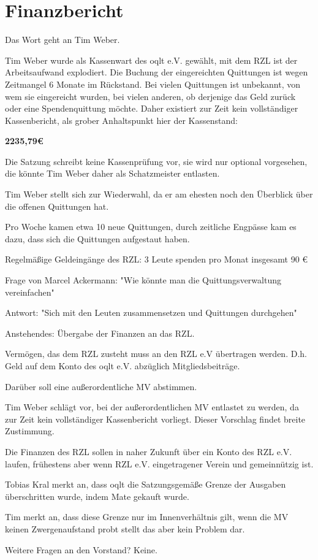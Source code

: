 \documentclass{scrartcl}
\begin{document}
\section{Finanzbericht}
{
Das Wort geht an Tim Weber.

Tim Weber wurde als Kassenwart des oqlt e.V. gewählt, mit dem RZL ist der Arbeitsaufwand explodiert.
Die Buchung der eingereichten Quittungen ist wegen Zeitmangel 6 Monate im Rückstand.
Bei vielen Quittungen ist unbekannt, von wem sie eingereicht wurden,
bei vielen anderen, ob derjenige das Geld zurück oder eine Spendenquittung möchte.
Daher existiert zur Zeit kein vollständiger Kassenbericht, als grober Anhaltspunkt hier der Kassenstand:

\textbf{2235,79€}

Die Satzung schreibt keine Kassenprüfung vor, sie wird nur optional vorgesehen,
die \MV könnte Tim Weber daher als Schatzmeister entlasten.

Tim Weber stellt sich zur Wiederwahl, da er am ehesten noch den Überblick über
die offenen Quittungen hat.

Pro Woche kamen etwa 10 neue Quittungen, durch zeitliche Engpässe
kam es dazu, dass sich die Quittungen aufgestaut haben.

Regelmäßige Geldeingänge des RZL:
3 Leute spenden pro Monat insgesamt 90 €

Frage von Marcel Ackermann:
"Wie könnte man die Quittungsverwaltung vereinfachen"

Antwort:
"Sich mit den Leuten zusammensetzen und Quittungen durchgehen"

Anstehendes:
Übergabe der Finanzen an das RZL.

Vermögen, das dem RZL zusteht muss an den RZL e.V übertragen werden.
D.h. Geld auf dem Konto des oqlt e.V. abzüglich Mitgliedsbeiträge.

Darüber soll eine außerordentliche MV abstimmen.

Tim Weber schlägt vor, bei der außerordentlichen MV entlastet zu werden,
da zur Zeit kein vollständiger Kassenbericht vorliegt.
Dieser Vorschlag findet breite Zustimmung.

Die Finanzen des RZL sollen in naher Zukunft über ein Konto des RZL e.V.
laufen, frühestens aber wenn RZL e.V. eingetragener Verein und gemeinnützig ist.

Tobias Kral merkt an, dass oqlt die Satzungsgemäße Grenze der Ausgaben überschritten
wurde, indem Mate gekauft wurde.

Tim merkt an, dass diese Grenze nur im Innenverhältnis gilt,
wenn die MV keinen Zwergenaufstand probt stellt das aber kein Problem dar.

Weitere Fragen an den Vorstand? Keine.

}
\end{document}
